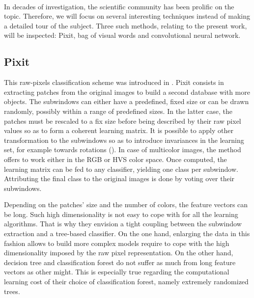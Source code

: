 \documentclass[a4paper]{report}
\newlength{\larg}
\begin{document}
\paragraph{}
In decades of investigation, the scientific community has been prolific on the topic. Therefore, we will focus on several interesting techniques instead of making a detailed tour of the subject.
Three such methods, relating to the present work, will be inspected: Pixit, bag of visual words and convolutional neural network.

\subsection{\label{subsec:Pixit}Pixit}
This raw-pixels classification scheme was introduced in \cite{pixit}. Pixit consists in extracting patches from the original images to build a second database with more objects. The subwindows can either have a predefined, fixed size or can be drawn randomly, possibly within a range of predefined sizes. In the latter case, the patches must be rescaled to a fix size before being described by their raw pixel values so as to form a coherent learning matrix. It is possible to apply other transformation to the subwindows so as to introduce invariances in the learning set, for example towards rotations (\cite{recapPixit}). In case of multicolor images, the method offers to work either in the RGB or HVS color space. 
Once computed, the learning matrix can be fed to any classifier, yielding one class per subwindow. Attributing the final class to the original images is done by voting over their subwindows.
\par
Depending on the patches' size and the number of colors, the feature vectors can be long. Such high dimensionality is not easy to cope with for all the learning algorithms. That is why they envision a tight coupling between the subwindow extraction and a tree-based classifier. On the one hand, enlarging the data in this fashion allows to build more complex models require to cope with the high dimensionality imposed by the raw pixel representation. On the other hand, decision tree and classification forest do not suffer as much from long feature vectors as other might. This is especially true regarding the computational learning cost of their choice of classification forest, namely extremely randomized trees.
\end{document}
